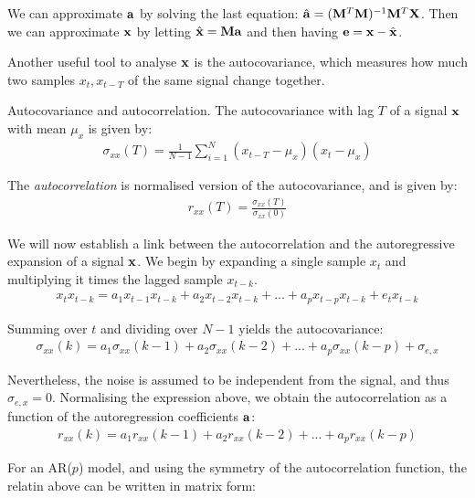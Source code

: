 \documentclass[../main.tex]{subfiles}
\begin{document}
\par We can approximate $\mathbf{a}$ by solving the last equation: $\hat{\mathbf{a}} = (\mathbf{M}^T\mathbf{M})^{-1}\mathbf{M}^T\mathbf{X}$. Then we can approximate $\mathbf{x}$ by letting $\hat{\mathbf{x}} = \mathbf{Ma}$ and then having $\mathbf{e} = \mathbf{x} - \hat{\mathbf{x}}$. 
\par Another useful tool to analyse $\mathbf{x}$ is the autocovariance, which measures how much two samples $x_t, x_{t-T}$ of the same signal change together. 
\begin{definition}{Autocovariance and autocorrelation.} \label{def_autocov}
The autocovariance with lag $T$ of a signal $\mathbf{x}$ with mean $\mu_x$ is given by:
\begin{align*}
\sigma_{xx}(T) = \frac{1}{N-1}\sum_{i=1}^N{(x_{t-T}-\mu_x)(x_t-\mu_x)}
\end{align*}
\par The \emph{autocorrelation} is normalised version of the autocovariance, and is given by:
\begin{align*}
r_{xx}(T) = \frac{\sigma_{xx}(T)}{\sigma_{xx}(0)}
\end{align*}
\end{definition}
\par We will now establish a link between the autocorrelation and the autoregressive expansion of a signal $\mathbf{x}$. We begin by expanding a single sample $x_t$ and multiplying it times the lagged sample $x_{t-k}$.
\begin{align*}
x_tx_{t-k} = a_1x_{t-1}x_{t-k} + a_2x_{t-2}x_{t-k} + ... + a_px_{t-p}x_{t-k} + e_tx_{t-k}
\end{align*}
\par Summing over $t$ and dividing over $N-1$ yields the autocovariance:
\begin{align*}
\sigma_{xx}(k) = a_1\sigma_{xx}(k-1) + a_2\sigma_{xx}(k-2) + ... + a_p\sigma_{xx}(k-p) + \sigma_{e,x}
\end{align*}
\par Nevertheless, the noise is assumed to be independent from the signal, and thus $\sigma_{e,x} = 0$. Normalising the expression above, we obtain the autocorrelation as a function of the autoregression coefficients $\mathbf{a}$:
\begin{align*}
r_{xx}(k) = a_1r_{xx}(k-1) + a_2r_{xx}(k-2) + ... + a_pr_{xx}(k-p)
\end{align*}
\par For an AR($p$) model, and using the symmetry of the autocorrelation function, the relatin above can be written in matrix form:
\end{document}
